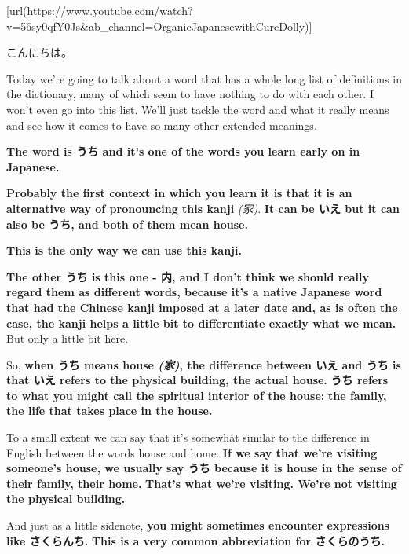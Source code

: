 \startsectionlevel[title={{\bf 97. The meanings of うち: Home, Self, Social boundary, Time marker: いまのうち、そのうち}},reference={the-meanings-of-うち-home-self-social-boundary-time-marker-いまのうちそのうち}]

[url(https://www.youtube.com/watch?v=56sy0qfY0Js&ab_channel=OrganicJapanesewithCureDolly)]

こんにちは。

Today we're going to talk about a word that has a whole long list of definitions in the dictionary, many of which seem to have nothing to do with each other. I won't even go into this list. We'll just tackle the word and what it really means and see how it comes to have so many other extended meanings.

{\bf The word is うち and it's one of the words you learn early on in Japanese.}

{}

{\bf Probably the first context in which you learn it is that it is an alternative way of pronouncing this kanji} {\em (家)}. {\bf It can be いえ but it can also be うち, and both of them mean house.}

{\bf This is the only way we can use this kanji.}

\thinrule

{\bf The other うち is this one - 内, and I don't think we should really regard them as different words, because it's a native Japanese word that had the Chinese kanji imposed at a later date and, as is often the case, the kanji helps a little bit to differentiate exactly what we mean.} But only a little bit here.

\thinrule

So, {\bf when うち means house {\em (家)}, the difference between いえ and うち is that いえ refers to the physical building, the actual house.} {\bf うち refers to what you might call the spiritual interior of the house:} {\bf the family, the life that takes place in the house.}

To a small extent we can say that it's somewhat similar to the difference in English between the words house and home. {\bf If we say that we're visiting someone's house, we usually say うち because it is house in the sense of their family, their home.} {\bf That's what we're visiting. We're not visiting the physical building.}

And just as a little sidenote, {\bf you might sometimes encounter expressions like さくらんち.} {\bf This is a very common abbreviation for さくらのうち.}

